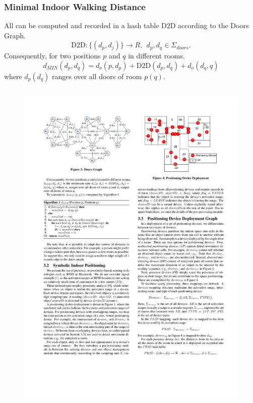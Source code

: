 \begin{frame}
\begin{columns}[c]
\end{columns}

\end{frame}


\begin{frame}
\frametitle{Minimal Indoor Walking Distance}

All  can be computed and recorded in a hash table $\mathrm{D2D}$ according to the Doors Graph.
\pause
\begin{equation}
  \mathrm{D2D}: { \{ (d_p, d_j) \} \rightarrow R, ~~d_p, d_q \in \Sigma_{doors} }.
\end{equation}
\pause
Consequently, for two positions ${p}$ and ${q}$ in different rooms.
\pause
\begin{equation}
  {d_{MIN}(d_p, d_q) = d_o(p, d_p) + \mathrm{D2D}(d_p, d_q) + d_o(d_q, q)}
\end{equation}
where ${d_p(d_q)}$ ranges over all doors of room ${p(q)}$.
\pause
\begin{columns}[c]

    \begin{figure}[tb]
      \includegraphics[width=\columnwidth]{figures/2-3/2-3-3.pdf}
    \end{figure}


\end{columns}
\end{frame}
